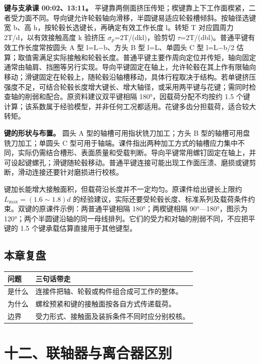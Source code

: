 \documentclass[zihao=5,a4paper,UTF8,fontset=fandol]{ctexart}
\begin{document}
\textbf{键与支承课 00:02、13:11。} 平键靠两侧面挤压传矩；楔键靠上下工作面楔紧，二者受力面不同。导向键允许轮毂轴向滑移，半圆键易适应轮毂槽倾斜。按轴径选键宽 b、高 h，按轮毂长选键长，再确定有效工作长度 l。转矩 T 对应圆周力 2T/d，以有效接触高度 k 验挤压 $\sigma$$_{p}$=2T/(dkl)，验剪切 $\tau$=2T/(dbl)。普通平键有效工作长度常按圆头 A 型 l=L$-$b、方头 B 型 l=L、单圆头 C 型 l=L$-$b/2 估算；取值需满足实际接触和轮毂长度。普通平键主要作周向定位并传矩，轴向固定通常由轴肩、挡圈等另行实现。导向平键固定在轴上，允许轮毂在其上作有限轴向移动；滑键固定在轮毂上，随轮毂沿轴槽移动，具体行程取决于结构。若单键挤压强度不足，可结合轮毂长度增大键长、增大轴径，或采用两平键与花键；需同时检查轴的削弱和配合。原资料建议双平键相隔 180°，因载荷分配不均按约 1.5 个键计算；该系数属于经验模型，并非任何工况都适用。花键多齿分担载荷，适合较大转矩。


\textbf{键的形状与布置。} 圆头 A 型的轴槽可用指状铣刀加工；方头 B 型的轴槽可用盘铣刀加工；单圆头 C 型可用于轴端。课件指出两种加工方式的轴槽应力集中不同，实际仍需结合槽形、表面质量和受载判断。导向平键常用螺钉固定在轴上，并可设起键螺孔；滑键随轮毂移动。普通平键连接可能出现工作面压溃、磨损或键剪断，滑动连接还要针对磨损进行校核。


键加长能增大接触面积，但载荷沿长度并不一定均匀。原课件给出键长上限约 $L_{\max}=(1.6\sim1.8)d$ 的经验建议，实际还要受轮毂长度、标准系列及载荷条件约束。双键的原课件示例：两普通平键相隔 180°；两楔键相隔 90°—180°，图示为 120°；两个半圆键沿轴的同一母线排列。它们的受力和对轴的削弱不同，不应把平键的 1.5 个键承载估算直接用于其他键型。




\subsection{本章复盘}

\begin{longtable}{p{7.51cm}p{7.51cm}}
\toprule
问题 & 三句话带走 \\

\midrule
\endhead
是什么 & 连接件把轴、轮毂或构件组合成可工作的整体。 \\
为什么 & 螺栓预紧和键的接触面按各自方式传递载荷。 \\
边界 & 受力形式、接触面及装拆条件不同时应分别校核。 \\
\bottomrule
\end{longtable}



\section{十二、联轴器与离合器区别}
\end{document}
